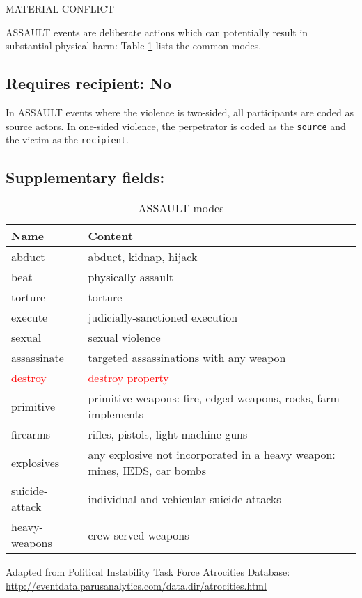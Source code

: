 \documentclass[11pt]{report}
\newcommand{\plcat}[1]{\textsf{#1}}
\newcommand{\andy}[1]{\textcolor{red}{#1}}
\begin{document}
\textsf{MATERIAL CONFLICT} \vspace{8pt}


\plcat{ASSAULT} events are deliberate actions which can potentially result in substantial physical harm: Table \ref{tab:violmode} lists the common modes.

\subsection{Requires recipient: No}

In \plcat{ASSAULT} events where the violence is two-sided, all participants are coded as source actors. In one-sided violence, the perpetrator is coded as the \texttt{source} and the victim as the \texttt{recipient}.

\subsection{Supplementary fields:}


\begin{table}[htp]
\caption{ASSAULT modes}
\begin{center}
\begin{tabular}{|l|l|}
\hline
Name & Content \\
\hline
abduct & abduct, kidnap, hijack \\
beat & physically assault \\
torture & torture \\
execute & judicially-sanctioned execution\\
sexual & sexual violence\\
assassinate & targeted assassinations with any weapon \\
\andy{destroy} & \andy{destroy property} \\
primitive & primitive weapons: fire, edged weapons, rocks, farm implements \\
firearms & rifles, pistols, light machine guns\\
explosives & any explosive not incorporated in a heavy weapon: mines, IEDS, car bombs \\
suicide-attack & individual and vehicular suicide attacks \\
heavy-weapons & crew-served weapons  \\
\hline
\end{tabular}
\end{center}
\label{tab:violmode}
\raggedright{Adapted from Political Instability Task Force Atrocities Database: \url{http://eventdata.parusanalytics.com/data.dir/atrocities.html}}
\end{table}%
\end{document}
